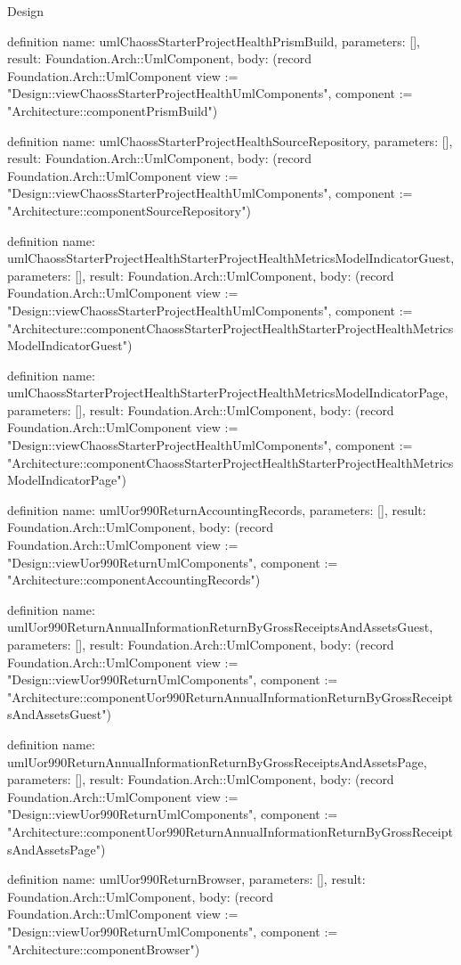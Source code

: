 \begin{lexlean}{Design}
\begin{semanticmodule}
definition{
  name: umlChaossStarterProjectHealthPrismBuild,
  parameters: [],
  result: Foundation.Arch::UmlComponent,
  body: (record Foundation.Arch::UmlComponent {view := "Design::viewChaossStarterProjectHealthUmlComponents", component := "Architecture::componentPrismBuild"})
}

definition{
  name: umlChaossStarterProjectHealthSourceRepository,
  parameters: [],
  result: Foundation.Arch::UmlComponent,
  body: (record Foundation.Arch::UmlComponent {view := "Design::viewChaossStarterProjectHealthUmlComponents", component := "Architecture::componentSourceRepository"})
}

definition{
  name: umlChaossStarterProjectHealthStarterProjectHealthMetricsModelIndicatorGuest,
  parameters: [],
  result: Foundation.Arch::UmlComponent,
  body: (record Foundation.Arch::UmlComponent {view := "Design::viewChaossStarterProjectHealthUmlComponents", component := "Architecture::componentChaossStarterProjectHealthStarterProjectHealthMetricsModelIndicatorGuest"})
}

definition{
  name: umlChaossStarterProjectHealthStarterProjectHealthMetricsModelIndicatorPage,
  parameters: [],
  result: Foundation.Arch::UmlComponent,
  body: (record Foundation.Arch::UmlComponent {view := "Design::viewChaossStarterProjectHealthUmlComponents", component := "Architecture::componentChaossStarterProjectHealthStarterProjectHealthMetricsModelIndicatorPage"})
}

definition{
  name: umlUor990ReturnAccountingRecords,
  parameters: [],
  result: Foundation.Arch::UmlComponent,
  body: (record Foundation.Arch::UmlComponent {view := "Design::viewUor990ReturnUmlComponents", component := "Architecture::componentAccountingRecords"})
}

definition{
  name: umlUor990ReturnAnnualInformationReturnByGrossReceiptsAndAssetsGuest,
  parameters: [],
  result: Foundation.Arch::UmlComponent,
  body: (record Foundation.Arch::UmlComponent {view := "Design::viewUor990ReturnUmlComponents", component := "Architecture::componentUor990ReturnAnnualInformationReturnByGrossReceiptsAndAssetsGuest"})
}

definition{
  name: umlUor990ReturnAnnualInformationReturnByGrossReceiptsAndAssetsPage,
  parameters: [],
  result: Foundation.Arch::UmlComponent,
  body: (record Foundation.Arch::UmlComponent {view := "Design::viewUor990ReturnUmlComponents", component := "Architecture::componentUor990ReturnAnnualInformationReturnByGrossReceiptsAndAssetsPage"})
}

definition{
  name: umlUor990ReturnBrowser,
  parameters: [],
  result: Foundation.Arch::UmlComponent,
  body: (record Foundation.Arch::UmlComponent {view := "Design::viewUor990ReturnUmlComponents", component := "Architecture::componentBrowser"})
}


\end{semanticmodule}
\end{lexlean}
